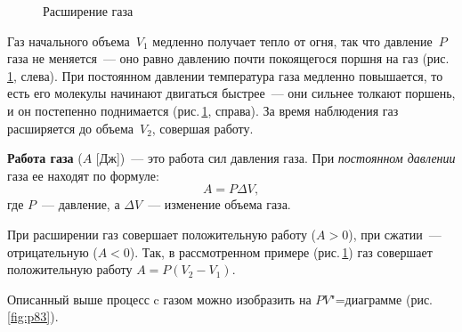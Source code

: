 \documentclass[main.tex]{subfiles}
\begin{document}
\begin{figure}[H]
\caption{Расширение газа}
\label{fig:p82}
\end{figure}

Газ начального объема~$V_1$ медленно получает тепло от огня, так что давление~$P$ газа не меняется~--- оно равно давлению почти покоящегося поршня на газ (рис.\,\ref{fig:p82}, слева). При постоянном давлении температура газа медленно повышается, то есть его молекулы начинают двигаться быстрее~--- они сильнее толкают поршень, и он постепенно поднимается (рис.\,\ref{fig:p82}, справа). За время наблюдения газ расширяется до объема~$V_2$, совершая работу.

\textbf{Работа газа} ($A$ [Дж])~--- это работа сил давления газа. При \emph{постоянном давлении} газа ее находят по формуле:
\begin{equation}
    A=P\Delta V,
\end{equation}
где $P$~--- давление, а $\Delta V$~--- изменение объема газа.

При расширении газ совершает положительную работу ($A>0$), при сжатии~--- отрицательную ($A<0$). Так, в рассмотренном примере (рис.\,\ref{fig:p82}) газ совершает положительную работу $A=P(V_2-V_1)$.

Описанный выше процесс c газом можно изобразить на $PV$"=диаграмме (рис.\,\ref{fig:p83}).
\end{document}
